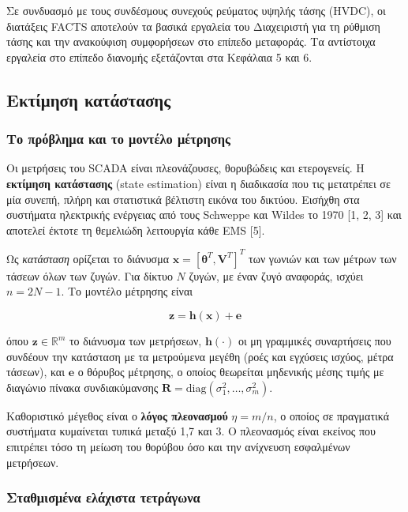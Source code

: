 Σε συνδυασμό με τους συνδέσμους συνεχούς ρεύματος υψηλής τάσης (HVDC), οι διατάξεις FACTS
αποτελούν τα βασικά εργαλεία του Διαχειριστή για τη ρύθμιση τάσης και την ανακούφιση συμφορήσεων
στο επίπεδο μεταφοράς. Τα αντίστοιχα εργαλεία στο επίπεδο διανομής εξετάζονται στα Κεφάλαια 5 και 6.

\subsection{Εκτίμηση κατάστασης}

\subsubsection*{Το πρόβλημα και το μοντέλο μέτρησης}

Οι μετρήσεις του SCADA είναι πλεονάζουσες, θορυβώδεις και ετερογενείς. Η \textbf{εκτίμηση
κατάστασης} (state estimation) είναι η διαδικασία που τις μετατρέπει σε μία συνεπή, πλήρη και
στατιστικά βέλτιστη εικόνα του δικτύου. Εισήχθη στα συστήματα ηλεκτρικής ενέργειας από τους
Schweppe και Wildes το 1970 [1, 2, 3] και αποτελεί έκτοτε τη θεμελιώδη λειτουργία κάθε EMS [5].

Ως \emph{κατάσταση} ορίζεται το διάνυσμα
$\mathbf{x} = [\boldsymbol{\theta}^{T}, \mathbf{V}^{T}]^{T}$ των γωνιών και των μέτρων των τάσεων
όλων των ζυγών. Για δίκτυο $N$ ζυγών, με έναν ζυγό αναφοράς, ισχύει $n = 2N-1$. Το μοντέλο μέτρησης
είναι

\begin{equation}
\mathbf{z} = \mathbf{h}(\mathbf{x}) + \mathbf{e}
\label{eq:measmodel}
\end{equation}

όπου $\mathbf{z} \in \mathbb{R}^{m}$ το διάνυσμα των μετρήσεων, $\mathbf{h}(\cdot)$ οι μη γραμμικές
συναρτήσεις που συνδέουν την κατάσταση με τα μετρούμενα μεγέθη (ροές και εγχύσεις ισχύος, μέτρα
τάσεων), και $\mathbf{e}$ ο θόρυβος μέτρησης, ο οποίος θεωρείται μηδενικής μέσης τιμής με
διαγώνιο πίνακα συνδιακύμανσης $\mathbf{R} = \mathrm{diag}(\sigma_1^2, \ldots, \sigma_m^2)$.

Καθοριστικό μέγεθος είναι ο \textbf{λόγος πλεονασμού} $\eta = m/n$, ο οποίος σε πραγματικά
συστήματα κυμαίνεται τυπικά μεταξύ 1,7 και 3. Ο πλεονασμός είναι εκείνος που επιτρέπει τόσο τη
μείωση του θορύβου όσο και την ανίχνευση εσφαλμένων μετρήσεων.

\subsubsection*{Σταθμισμένα ελάχιστα τετράγωνα}

